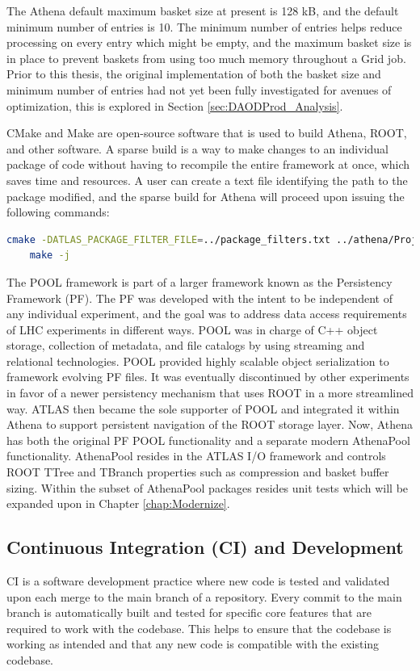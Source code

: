 The Athena default maximum basket size at present is 128 kB, and the default minimum number of entries is 10.
The minimum number of entries helps reduce processing on every entry which might be empty, and the maximum basket size is in place to prevent baskets from using too much memory throughout a Grid job.  
Prior to this thesis, the original implementation of both the basket size and minimum number of entries had not yet been fully investigated for avenues of optimization, this is explored in Section \ref{sec:DAODProd_Analysis}.

CMake and Make are open-source software that is used to build Athena, ROOT, and other software.
A sparse build is a way to make changes to an individual package of code without having to recompile the entire framework at once, which saves time and resources. 
A user can create a text file identifying the path to the package modified, and the sparse build for Athena will proceed upon issuing the following commands:
\begin{lstlisting}[language=bash]
    cmake -DATLAS_PACKAGE_FILTER_FILE=../package_filters.txt ../athena/Projects/WorkDir/ 
    make -j
\end{lstlisting}

The POOL framework is part of a larger framework known as the Persistency Framework (PF). \cite{Trentadue_2012}
The PF was developed with the intent to be independent of any individual experiment, and the goal was to address data access requirements of LHC experiments in different ways.
POOL was in charge of C++ object storage, collection of metadata, and file catalogs by using streaming and relational technologies. 
POOL provided highly scalable object serialization to framework evolving PF files. 
It was eventually discontinued by other experiments in favor of a newer persistency mechanism that uses ROOT in a more streamlined way.
ATLAS then became the sole supporter of POOL and integrated it within Athena to support persistent navigation of the ROOT storage layer.
Now, Athena has both the original PF POOL functionality and a separate modern AthenaPool functionality. 
AthenaPool resides in the ATLAS I/O framework and controls ROOT TTree and TBranch properties such as compression and basket buffer sizing.
Within the subset of AthenaPool packages resides unit tests which will be expanded upon in Chapter \ref{chap:Modernize}.


\subsection{Continuous Integration (CI) and Development}
CI is a software development practice where new code is tested and validated upon each merge to the main branch of a repository. 
Every commit to the main branch is automatically built and tested for specific core features that are required to work with the codebase. 
This helps to ensure that the codebase is working as intended and that any new code is compatible with the existing codebase.

